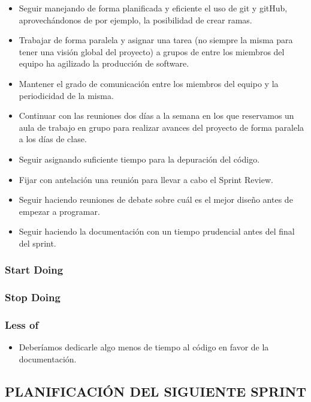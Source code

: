 \documentclass[
]{article}
\providecommand{\tightlist}{%
  \setlength{\itemsep}{0pt}\setlength{\parskip}{0pt}}
\begin{document}
\begin{itemize}
\item
  Seguir manejando de forma planificada y eficiente el uso de git y
  gitHub, aprovechándonos de por ejemplo, la posibilidad de crear ramas.
\item
  Trabajar de forma paralela y asignar una tarea (no siempre la misma
  para tener una visión global del proyecto) a grupos de entre los
  miembros del equipo ha agilizado la producción de software.
\item
  Mantener el grado de comunicación entre los miembros del equipo y la
  periodicidad de la misma.
\item
  Continuar con las reuniones dos días a la semana en los que reservamos
  un aula de trabajo en grupo para realizar avances del proyecto de
  forma paralela a los días de clase.
\item
  Seguir asignando suficiente tiempo para la depuración del código.
\item
  Fijar con antelación una reunión para llevar a cabo el Sprint Review.
\item
  Seguir haciendo reuniones de debate sobre cuál es el mejor diseño
  antes de empezar a programar.
\item
  Seguir haciendo la documentación con un tiempo prudencial antes del
  final del sprint.
\end{itemize}

\hypertarget{start-doing}{%
\subsubsection{Start Doing}\label{start-doing}}

\hypertarget{stop-doing}{%
\subsubsection{Stop Doing}\label{stop-doing}}

\hypertarget{less-of}{%
\subsubsection{Less of}\label{less-of}}

\begin{itemize}
\tightlist
\item
  Deberíamos dedicarle algo menos de tiempo al código en favor de la
  documentación.
\end{itemize}

\hypertarget{planificaciuxf3n-del-siguiente-sprint}{%
\subsection{PLANIFICACIÓN DEL SIGUIENTE
SPRINT}\label{planificaciuxf3n-del-siguiente-sprint}}
\end{document}
